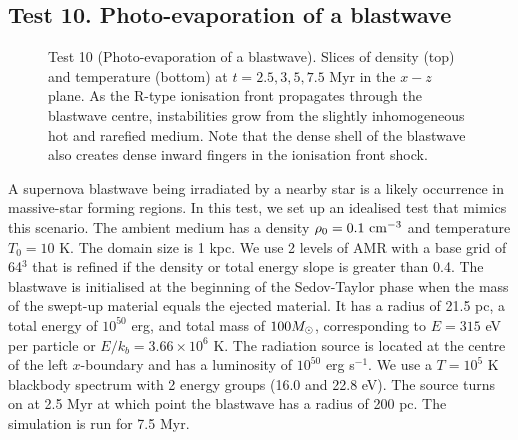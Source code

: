 \documentclass[useAMS,usenatbib]{mn2e}
\begin{document}
\subsection{Test 10. Photo-evaporation of a blastwave}

\begin{figure*}
  \caption{\label{fig:test10} Test 10 (Photo-evaporation of a
    blastwave).  Slices of density (top) and temperature (bottom) at
    $t = 2.5, 3, 5, 7.5$ Myr in the $x-z$ plane.  As the R-type
    ionisation front propagates through the blastwave centre,
    instabilities grow from the slightly inhomogeneous hot and rarefied
    medium.  Note that the dense shell of the blastwave also creates
    dense inward fingers in the ionisation front shock.}
\end{figure*}

A supernova blastwave being irradiated by a nearby star is a likely
occurrence in massive-star forming regions.  In this test, we set up an
idealised test that mimics this scenario.  The ambient medium has a
density $\rho_0 = 0.1~\cubecm$ and temperature $T_0 = 10$ K.  The
domain size is 1 kpc.  We use 2 levels of AMR with a base grid of
64$^3$ that is refined if the density or total energy slope is greater
than 0.4.  The blastwave is initialised at the beginning of the
Sedov-Taylor phase when the mass of the swept-up material equals the
ejected material.  It has a radius of 21.5 pc, a total energy of
$10^{50}$ erg, and total mass of $100 \Ms$, corresponding to $E = 315$
eV per particle or $E/k_b = 3.66 \times 10^6$ K.  The radiation source
is located at the centre of the left $x$-boundary and has a luminosity
of $10^{50}$ erg s$^{-1}$.  We use a $T=10^5$ K blackbody spectrum
with 2 energy groups (16.0 and 22.8 eV).  The source turns on at 2.5
Myr at which point the blastwave has a radius of 200 pc.  The
simulation is run for 7.5 Myr.
\end{document}
